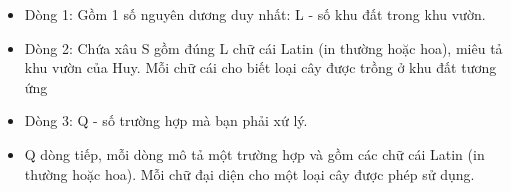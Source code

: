 \begin{itemize}
	\item Dòng 1: Gồm 1 số nguyên dương duy nhất: L - số khu đất trong khu vườn.
	\item Dòng 2: Chứa xâu S gồm đúng L chữ cái Latin (in thường hoặc hoa), miêu tả khu vườn của Huy. Mỗi chữ cái cho biết loại cây được trồng ở khu đất tương ứng
	\item Dòng 3: Q - số trường hợp mà bạn phải xứ lý.
	\item Q dòng tiếp, mỗi dòng mô tả một trường hợp và gồm các chữ cái Latin (in thường hoặc hoa). Mỗi chữ đại diện cho một loại cây được phép sử dụng.
\end{itemize}